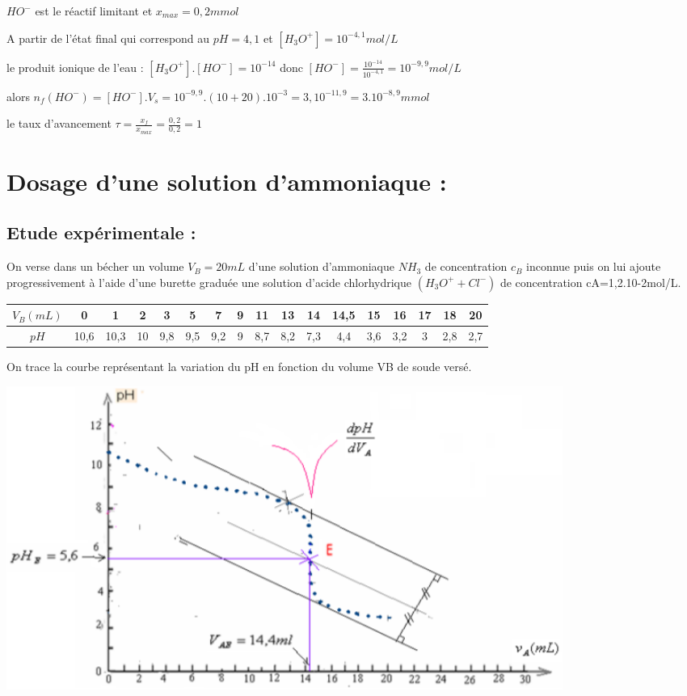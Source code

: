 \documentclass[12pt]{article}
\begin{document}
$HO^-$ est le réactif limitant et $x_{max}=0,2mmol$

A partir de l'état final qui correspond au $pH = 4,1$ et $[H_3O^+] = 10^{-4,1} mol/L$ 

le produit ionique de l'eau : $[H_3O^+].[HO^-] = 10^{-14}$ donc $[HO^-] = \frac{10^{-14}}{10^{-4,1}} = 10^{-9,9} mol/L$

alors $n_f(HO^-) = [HO^-].V_s = 10^{-9,9}.(10 + 20 ).10^{-3} = 3,10^{-11,9} = 3.10^{-8,9}mmol$

le taux d'avancement $\tau = \frac{x_f}{x_{max}} = \frac{0,2}{0,2} =1$


\section{Dosage d'une solution d'ammoniaque : }

\subsection{Etude expérimentale : }

On verse dans un bécher un volume $V_B=20mL$ d'une solution d'ammoniaque $NH_3$ de concentration $c_B$ inconnue puis on lui ajoute progressivement à l'aide d'une burette graduée une solution d'acide chlorhydrique
$(H_3O^+ + Cl^-)$ de concentration cA=1,2.10-2mol/L.


\begin{tabular}{|c|c|c|c|c|c|c|c|c|c|c|c|c|c|c|c|c|}
	\hline
	$V_B(mL)$ & 0& 1  &2 &3  &5  &7  &9&11 &13 &14 &14,5&15&16&17&18&20\\\hline
	$pH$    &10,6&10,3&10&9,8&9,5&9,2&9&8,7&8,2&7,3 &4,4&3,6&3,2&3&2,8&2,7\\\hline
\end{tabular}
On trace la courbe représentant la variation du pH en fonction du volume VB de soude versé.

\begin{center}
	\includegraphics[width=0.8\textwidth]{./img/dosage03.png}
\end{center}
\end{document}
